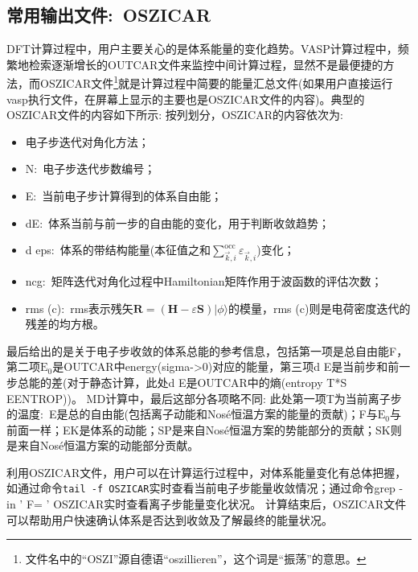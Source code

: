 \subsection{常用输出文件:~\rm{OSZICAR}}\label{subsectr:OSZICAR}
\textrm{DFT}计算过程中，用户主要关心的是体系能量的变化趋势。\textrm{VASP}计算过程中，频繁地检索逐渐增长的\textrm{OUTCAR}文件来监控中间计算过程，显然不是最便捷的方法，而\textrm{OSZICAR}文件\footnote{文件名中的\textrm{``OSZI''}源自德语\textrm{``oszillieren''}，这个词是``振荡''的意思。}就是计算过程中简要的能量汇总文件(如果用户直接运行\textrm{vasp}执行文件，在屏幕上显示的主要也是\textrm{OSZICAR}文件的内容)。典型的\textrm{OSZICAR}文件的内容如下所示:
{\fontsize{8.2pt}{6.2pt}\selectfont{
}}
按列划分，\textrm{OSZICAR}的内容依次为:
\begin{itemize}
	\item 电子步迭代对角化方法；
	\item \textrm{N}:~电子步迭代步数编号；
	\item \textrm{E}:~当前电子步计算得到的体系自由能；
	\item \textrm{dE}:~体系当前与前一步的自由能的变化，用于判断收敛趋势；
	\item \textrm{d eps}:~体系的带结构能量(本征值之和$\sum\limits_{\vec k,i}^\mathrm{occ}\varepsilon_{\vec k,i}$)变化；
	\item \textrm{ncg}:~矩阵迭代对角化过程中\textrm{Hamiltonian}矩阵作用于波函数的评估次数；
	\item \textrm{rms (c)}:~\textrm{rms}表示残矢$\mathbf{R}=(\mathbf{H}-\varepsilon\mathbf{S})|\phi\rangle$的模量，\textrm{rms (c)}则是电荷密度迭代的残差的均方根。
\end{itemize}
最后给出的是关于电子步收敛的体系总能的参考信息，包括第一项是总自由能\textrm{F}，第二项$\mathrm{E}_0$是\textrm{OUTCAR}中\textrm{energy(sigma->0)}对应的能量，第三项\textrm{d E}是当前步和前一步总能的差(对于静态计算，此处\textrm{d E}是\textrm{OUTCAR}中的熵\textrm{(entropy T*S EENTROP)})。%
\textrm{MD}计算中，最后这部分各项略不同:
{\fontsize{8.2pt}{6.2pt}\selectfont{
}}
此处第一项\textrm{T}为当前离子步的温度:~\textrm{E}是总的自由能(包括离子动能和\textrm{Nos\'e}恒温方案的能量的贡献)；\textrm{F}与$\mathrm{E}_0$与前面一样；\textrm{EK}是体系的动能；\textrm{SP}是来自\textrm{Nos\'e}恒温方案的势能部分的贡献；\textrm{SK}则是来自\textrm{Nos\'e}恒温方案的动能部分贡献。

利用\textrm{OSZICAR}文件，用户可以在计算运行过程中，对体系能量变化有总体把握，如通过命令\texttt{tail -f OSZICAR}实时查看当前电子步能量收敛情况；通过命令\textrm{grep -in ' F= ' OSZICAR}实时查看离子步能量变化状况。
计算结束后，\textrm{OSZICAR}文件可以帮助用户快速确认体系是否达到收敛及了解最终的能量状况。

